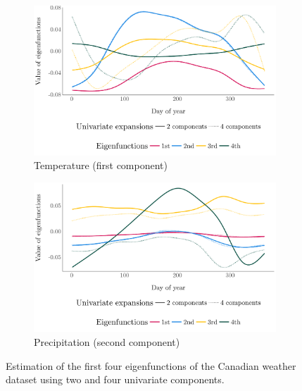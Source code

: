 \begin{figure}
     \centering
     \begin{subfigure}[b]{0.49\textwidth}
         \centering
         \includegraphics[width=1\textwidth]{figures/temperature_eigen.pdf}
         \caption{Temperature (first component)}
         \label{fig:temperature}
     \end{subfigure}
     \hfill
     \begin{subfigure}[b]{0.49\textwidth}
         \centering
         \includegraphics[width=1\textwidth]{figures/precipitation_eigen.pdf}
         \caption{Precipitation (second component)}
         \label{fig:precipitation}
     \end{subfigure}
     \caption{Estimation of the first four eigenfunctions of the Canadian weather dataset using two and four univariate components.}
     \label{fig:eigenfunctions_weather}
\end{figure}


